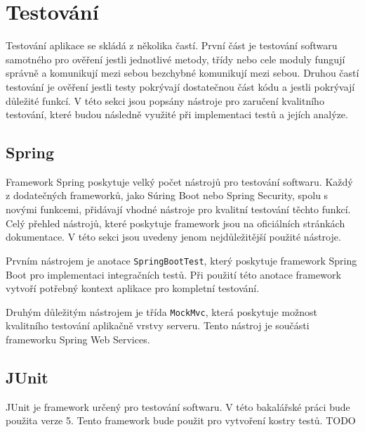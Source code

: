     
\section{Testování}\label{resere:testovani}
    Testování aplikace se skládá z několika častí. První část je testování softwaru samotného pro ověření jestli jednotlivé metody, třídy nebo cele moduly fungují správně a komunikují mezi sebou bezchybné komunikují mezi sebou. Druhou častí testování je ověření jestli testy pokrývají dostatečnou část kódu a jestli pokrývají důležité funkcí. V této sekci jsou popsány nástroje pro zaručení kvalitního testování, které budou následně využité při implementaci testů a jejích analýze.
    
    \subsection{Spring}
        Framework Spring poskytuje velký počet nástrojů pro testování softwaru. Každý z dodatečných frameworků, jako Súring Boot nebo Spring Security, spolu s novými funkcemi, přidávají vhodné nástroje pro kvalitní testování těchto funkcí. Celý přehled nástrojů, které poskytuje framework jsou na oficiálních stránkách dokumentace\cite{spring-tests-doc}. V této sekci jsou uvedeny jenom nejdůležitější použité nástroje.
        
        Prvním nástrojem je anotace \texttt{SpringBootTest}, který poskytuje framework Spring Boot pro implementaci integračních testů. Při použití této anotace framework vytvoří potřebný kontext aplikace pro kompletní testování.
        
        Druhým důležitým nástrojem je třída \texttt{MockMvc}, která poskytuje možnost kvalitního testování aplikačně vrstvy serveru. Tento nástroj je součásti frameworku Spring Web Services.
        
    \subsection{JUnit}
        JUnit je framework určený pro testování softwaru. V této bakalářské práci bude použita verze 5. Tento framework bude použit pro vytvoření kostry testů. TODO
        
